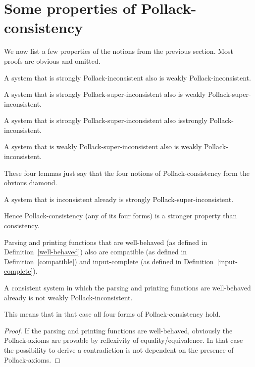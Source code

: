 \documentclass{entcs}
\begin{document}
\section{Some properties of Pollack-consistency}
\label{properties}

We now list a few properties of the notions
from the previous section.
Most proofs are obvious and omitted.

\begin{lemma}
A system that is strongly Pollack-inconsistent also is weakly Pol\-lack-inconsistent.
\end{lemma}

\begin{lemma}
A system that is strongly Pollack-super-inconsistent also is weak\-ly Pol\-lack-super-inconsistent.
\end{lemma}

\begin{lemma}
A system that is strongly Pollack-super-inconsistent also is\break strongly
Pollack-inconsistent.
\end{lemma}

\begin{lemma}
A system that is weakly Pollack-super-inconsistent also is weakly
Pol\-lack-inconsistent.
\end{lemma}

\noindent
These four lemmas just say that the four notions of Pollack-consistency
form the obvious diamond.

\begin{lemma}
A system that is inconsistent already is strongly Pollack-super-inconsistent.
\end{lemma}

\noindent
Hence Pollack-consistency (any of its four forms)
is a stronger property than consistency.

\begin{lemma}
Parsing and printing functions that are well-behaved (as defined
in Definition~\ref{well-behaved}) also are compatible (as defined
in Definition~\ref{compatible}) and input-complete (as defined in
Definition~\ref{input-complete}).
\end{lemma}

\begin{lemma}
\label{well-behaved-lemma}
A consistent system in which the parsing and printing functions are
well-behaved already is not weakly Pollack-inconsistent.
\end{lemma}
\noindent
This means that in that case all four forms of Pollack-consistency
hold.
\begin{proof}
If the parsing and printing functions are well-behaved, obviously the
Pollack-axioms are provable by reflexivity of equality/equivalence.
In that case the possibility to derive a contradiction
is not dependent on the presence of Pollack-axioms.
\end{proof}
\end{document}
